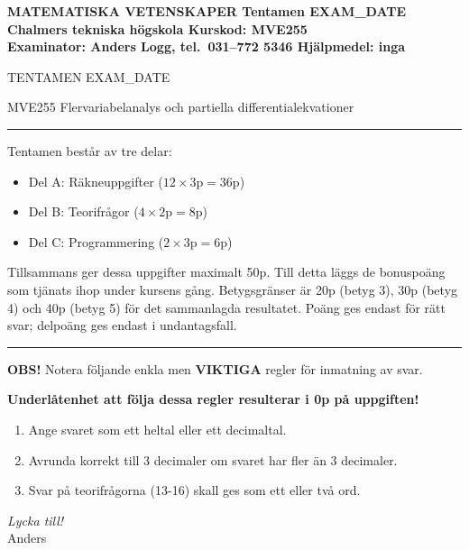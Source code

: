 \documentclass[a4paper,11pt]{article}
\begin{document}
\footnotesize
\bf\noindent
MATEMATISKA VETENSKAPER \hfill Tentamen EXAM_DATE \\
Chalmers tekniska högskola \hfill Kurskod: MVE255 \\
Examinator: Anders Logg, tel.~031--772 5346 \hfill Hjälpmedel: inga

\linespread{1.5}

\bigskip

\begin{center}

  \Large\bf

  TENTAMEN EXAM_DATE

  \smallskip

  MVE255 Flervariabelanalys och partiella differentialekvationer

  \bigskip

\end{center}

\rm
\large

\hrule

\smallskip

\noindent
Tentamen består av tre delar:
\begin{itemize}
\item
  Del A: Räkneuppgifter ($12 \times 3\mathrm{p} = 36\mathrm{p}$)
\item
  Del B: Teorifrågor ($4 \times 2\mathrm{p} = 8\mathrm{p}$)
\item
  Del C: Programmering ($2 \times 3\mathrm{p} = 6\mathrm{p}$)
\end{itemize}
Tillsammans ger dessa uppgifter maximalt 50p.
Till detta läggs de bonuspoäng som tjänats ihop under kursens gång.
Betygsgränser är 20p (betyg 3), 30p (betyg 4) och 40p (betyg 5)
för det sammanlagda resultatet. Poäng ges endast för rätt svar;
delpoäng ges endast i undantagsfall.

\bigskip

\hrule

\smallskip


\textbf{OBS!} Notera följande enkla men \textbf{VIKTIGA} regler för inmatning av svar.

\textbf{Underlåtenhet att följa dessa regler resulterar i 0p på uppgiften!}

\begin{enumerate}
\item
  Ange svaret som ett heltal eller ett decimaltal.
\item
  Avrunda korrekt till 3 decimaler om svaret har fler än 3 decimaler.
\item
  Svar på teorifrågorna (13-16) skall ges som ett eller två ord.
\end{enumerate}

\bigskip

{\emph{Lycka till!} \\[1em] Anders}

\newpage
\end{document}
